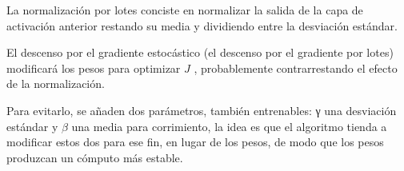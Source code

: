 La normalización por lotes conciste en normalizar la salida de la capa de activación anterior restando su media y dividiendo entre la desviación estándar.

El descenso por el gradiente estocástico (el descenso por el gradiente por lotes) modificará los pesos para optimizar $J$ , probablemente contrarrestando el efecto de la normalización.

Para evitarlo, se añaden dos parámetros, también entrenables: γ una desviación estándar y $\beta$ una media para corrimiento, la idea es que el algoritmo tienda a
modificar estos dos para ese fin, en lugar de los pesos, de modo que los pesos
produzcan un cómputo más estable.
